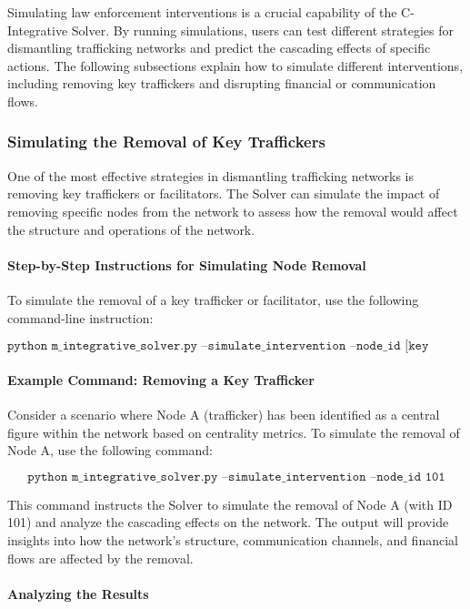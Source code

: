\documentclass[%
 preprint, linenumbers,
 amsmath,amssymb,
 aps, physrev,
]{revtex4-2}
\begin{document}
Simulating law enforcement interventions is a crucial capability of the C-Integrative Solver. By running simulations, users can test different strategies for dismantling trafficking networks and predict the cascading effects of specific actions. The following subsections explain how to simulate different interventions, including removing key traffickers and disrupting financial or communication flows.

\subsubsection{Simulating the Removal of Key Traffickers}

One of the most effective strategies in dismantling trafficking networks is removing key traffickers or facilitators. The Solver can simulate the impact of removing specific nodes from the network to assess how the removal would affect the structure and operations of the network.

\paragraph{Step-by-Step Instructions for Simulating Node Removal}

To simulate the removal of a key trafficker or facilitator, use the following command-line instruction:

\[
\texttt{python m\_integrative\_solver.py --simulate\_intervention --node\_id [key trafficker ID]}
\]

\paragraph{Example Command: Removing a Key Trafficker}

Consider a scenario where Node A (trafficker) has been identified as a central figure within the network based on centrality metrics. To simulate the removal of Node A, use the following command:

\[
\texttt{python m\_integrative\_solver.py --simulate\_intervention --node\_id 101}
\]

This command instructs the Solver to simulate the removal of Node A (with ID 101) and analyze the cascading effects on the network. The output will provide insights into how the network’s structure, communication channels, and financial flows are affected by the removal.

\paragraph{Analyzing the Results}
\end{document}
